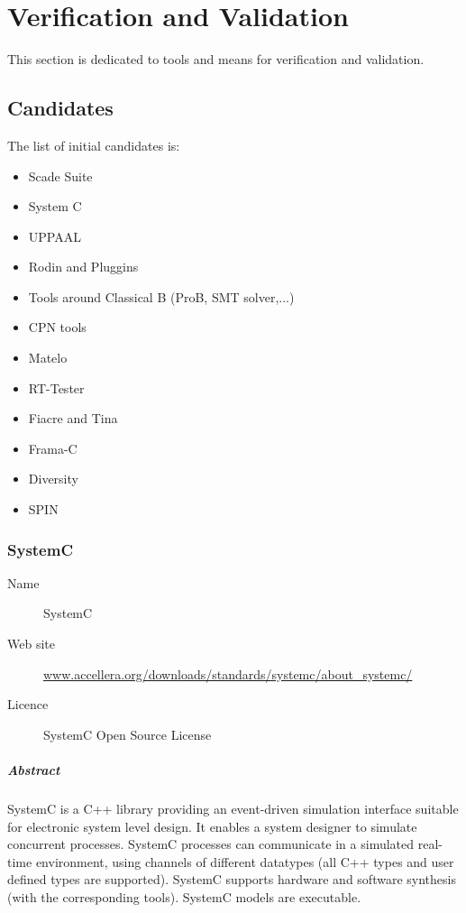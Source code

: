

\chapter{Verification and Validation}
\label{sec:VnV}

This section is dedicated to tools and means for verification and validation.

\section{Candidates}


The list of initial candidates is:

\begin{itemize}
\item Scade Suite
\item System C
\item UPPAAL
\item Rodin and Pluggins
\item Tools around Classical B (ProB, SMT solver,...)
\item CPN tools
\item Matelo
\item RT-Tester
\item Fiacre and Tina
\item Frama-C
\item Diversity
\item SPIN
\end{itemize}

\subsection{SystemC}

\begin{description}
\item[Name] SystemC
\item[Web site] \url{www.accellera.org/downloads/standards/systemc/about_systemc/}
\item[Licence] SystemC Open Source License
\end{description}

\paragraph{Abstract} SystemC is a C++ library providing an event-driven simulation interface suitable for electronic system level design. It enables a system designer to simulate concurrent processes. SystemC processes can communicate in a simulated real-time environment, using channels of different datatypes (all C++ types and user defined types are supported). SystemC supports hardware and software synthesis (with the corresponding tools). SystemC models are executable.

